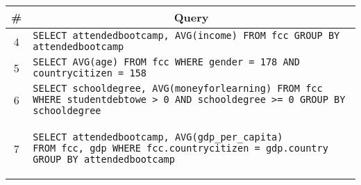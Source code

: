 \begin{tabular}{cl}
\toprule
\# & \multicolumn{1}{c}{Query} \\
\midrule
4 & \verb|SELECT attendedbootcamp, AVG(income) FROM fcc GROUP BY attendedbootcamp| {queryno} \label{q4} \\
5 & 
\verb|SELECT AVG(age) FROM fcc WHERE gender = 178 AND countrycitizen = 158|
{queryno} \label{q5} \\
6 & \verb|SELECT schooldegree, AVG(moneyforlearning) FROM fcc WHERE studentdebtowe > 0 AND schooldegree >= 0 GROUP BY schooldegree| {queryno} \label{q6}\\
7 & 
\begin{minipage}{6in}
\begin{lstlisting}[breaklines]
SELECT attendedbootcamp, AVG(gdp_per_capita)
FROM fcc, gdp WHERE fcc.countrycitizen = gdp.country
GROUP BY attendedbootcamp
\end{lstlisting}
\end{minipage}{queryno} \label{q7}\\
\bottomrule
\end{tabular}
